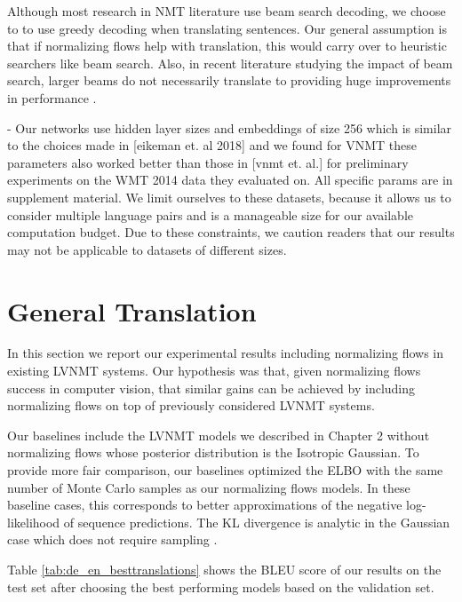 Although most research in \ac{NMT} literature use beam search decoding, we choose to to use greedy decoding when translating sentences. Our general assumption is that if normalizing flows help with translation, this would carry over to heuristic searchers like beam search. Also, in recent literature studying the impact of beam search, larger beams do not necessarily translate to providing huge improvements in performance \cite{cohen2019unconstrained}. 

- Our networks use hidden layer sizes and embeddings of size 256 which is similar to the choices made in [eikeman et. al 2018] and we found for VNMT these parameters also worked better than those in [vnmt et. al.] for preliminary experiments on the WMT 2014 data they evaluated on. All specific params are in supplement material.
We limit ourselves to these datasets, because it allows us to consider multiple language pairs and is a manageable size for our available computation budget. Due to these constraints, we caution readers that our results may not be applicable to datasets of different sizes.

\section{General Translation}

In this section we report our experimental results including normalizing flows in existing \ac{LVNMT} systems. Our hypothesis was that, given normalizing flows success in computer vision, that similar gains can be achieved by including normalizing flows on top of previously considered \ac{LVNMT} systems.  

Our baselines include the \ac{LVNMT} models we described in Chapter 2 without normalizing flows whose posterior distribution is the Isotropic Gaussian. To provide more fair comparison, our baselines optimized the \ac{ELBO} with the same number of Monte Carlo samples as our normalizing flows models. In these baseline cases, this corresponds to better approximations of the negative log-likelihood of sequence predictions. The KL divergence is analytic in the Gaussian case which does not require sampling \cite{kingma2014autoencodingVB,rezende2014stochasticBackprop}.

 Table \ref{tab:de_en_besttranslations} shows the BLEU score of our results on the test set after choosing the best performing models based on the validation set. 

